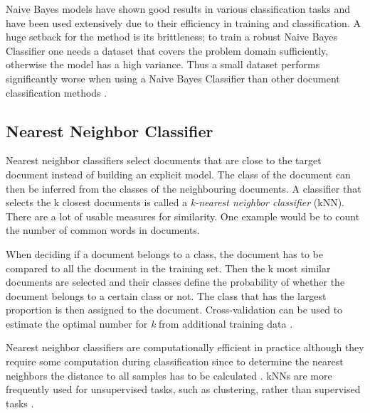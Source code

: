 Naive Bayes models have shown good results in various classification tasks and have been used extensively due to their efficiency in training and classification.
A huge setback for the method is its brittleness; to train a robust Naive Bayes Classifier one needs a dataset that covers the problem domain sufficiently, otherwise the model has a high variance. Thus a small dataset performs significantly worse when using a Naive Bayes Classifier than other document classification methods \cite{rigutini2004} \cite{lewis1998}.

\subsection{Nearest Neighbor Classifier} \label{Nearest Neighbor Classifier}
Nearest neighbor classifiers select documents that are close to the target document instead of building an explicit model.
The class of the document can then be inferred from the classes of the neighbouring documents.
A classifier that selects the k closest documents is called a \textit{k-nearest neighbor classifier} (kNN).
There are a lot of usable measures for similarity. One example would be to count the number of common words in documents.

When deciding if a document belongs to a class, the document has to be compared to all the document in the training set.
Then the k most similar documents are selected and their classes define the probability of whether the document belongs to a certain class or not.
The class that has the largest proportion is then assigned to the document.
Cross-validation can be used to estimate the optimal number for \textit{k} from additional training data \cite{hotho}.

Nearest neighbor classifiers are computationally efficient in practice although they require some computation during classification since to determine the nearest neighbors the distance to all samples has to be calculated \cite{hotho}.
kNNs are more frequently used for unsupervised tasks, such as clustering, rather than supervised tasks \cite{rigutini2004}.



